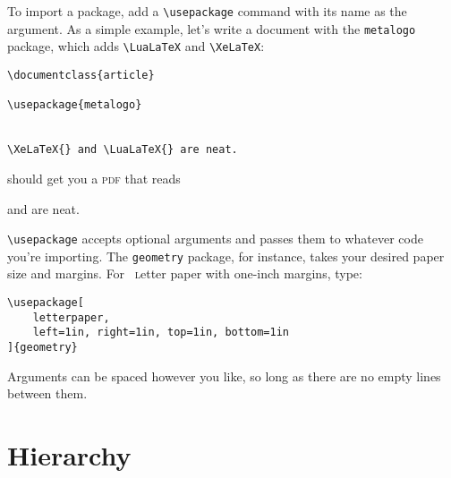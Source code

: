To import a package, add a \verb|\usepackage| command
with its name as the argument.
As a simple example, let's write a document with the \texttt{metalogo}
package, which adds \verb|\LuaLaTeX| and \verb|\XeLaTeX|:
\begin{leftfigure}
\begin{lstlisting}
\documentclass{article}

\usepackage{metalogo}


\XeLaTeX{} and \LuaLaTeX{} are neat.

\end{lstlisting}
\end{leftfigure}
\begin{samepage}
should get you a \textsc{pdf} that reads
\begin{leftfigure}
\lm \XeLaTeX{} and \LuaLaTeX{} are neat.
\end{leftfigure}
\end{samepage}
\verb|\usepackage| accepts optional arguments
and passes them to whatever code you're importing.
The \texttt{geometry} package, for instance,
takes your desired paper size and margins.
For ~\textsc{l}etter paper with one-inch margins,
type:
\begin{leftfigure}
\begin{lstlisting}
\usepackage[
    letterpaper,
    left=1in, right=1in, top=1in, bottom=1in
]{geometry}
\end{lstlisting}
\end{leftfigure}
Arguments can be spaced however you like,
so long as there are no empty lines between them.

\section{Hierarchy}

